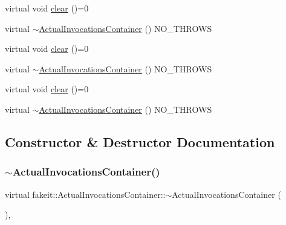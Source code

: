 \begin{DoxyCompactItemize}
virtual void \mbox{\hyperlink{structfakeit_1_1ActualInvocationsContainer_ab0af1e59028b53f8258b713f89bfdcbe}{clear}} ()=0
\item 
virtual \mbox{\hyperlink{structfakeit_1_1ActualInvocationsContainer_ac7fa0ac80cc23f8c00dddb7901e452c3}{$\sim$\+Actual\+Invocations\+Container}} () N\+O\+\_\+\+T\+H\+R\+O\+WS
\item 
virtual void \mbox{\hyperlink{structfakeit_1_1ActualInvocationsContainer_ab0af1e59028b53f8258b713f89bfdcbe}{clear}} ()=0
\item 
virtual \mbox{\hyperlink{structfakeit_1_1ActualInvocationsContainer_ac7fa0ac80cc23f8c00dddb7901e452c3}{$\sim$\+Actual\+Invocations\+Container}} () N\+O\+\_\+\+T\+H\+R\+O\+WS
\item 
virtual void \mbox{\hyperlink{structfakeit_1_1ActualInvocationsContainer_ab0af1e59028b53f8258b713f89bfdcbe}{clear}} ()=0
\item 
virtual \mbox{\hyperlink{structfakeit_1_1ActualInvocationsContainer_ac7fa0ac80cc23f8c00dddb7901e452c3}{$\sim$\+Actual\+Invocations\+Container}} () N\+O\+\_\+\+T\+H\+R\+O\+WS
\end{DoxyCompactItemize}


\subsection{Constructor \& Destructor Documentation}
\mbox{\label{structfakeit_1_1ActualInvocationsContainer_ac7fa0ac80cc23f8c00dddb7901e452c3}} 
\subsubsection{\texorpdfstring{$\sim$ActualInvocationsContainer()}{~ActualInvocationsContainer()}\hspace{0.1cm}{\footnotesize\ttfamily [1/9]}}
{\footnotesize\ttfamily virtual fakeit\+::\+Actual\+Invocations\+Container\+::$\sim$\+Actual\+Invocations\+Container (\begin{DoxyParamCaption}{ }\end{DoxyParamCaption})\hspace{0.3cm}{\ttfamily [inline]}, {\ttfamily [virtual]}}

